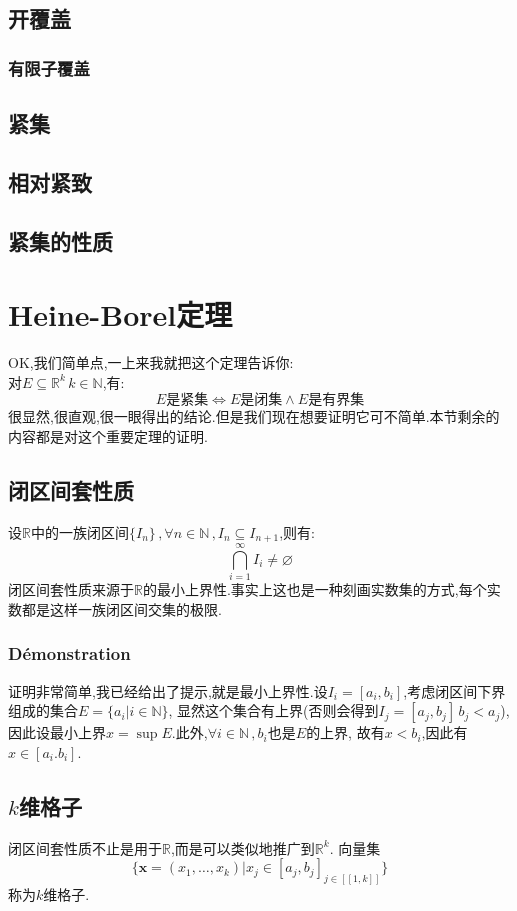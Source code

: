 \documentclass[12pt, a4paper, oneside]{ctexbook}
\begin{document}
  \subsection{开覆盖}
  \subsubsection{有限子覆盖}
  \subsection{紧集}
  \subsection{相对紧致}
  \subsection{紧集的性质}
\section{Heine-Borel定理}
  \noindent
  OK,我们简单点,一上来我就把这个定理告诉你:\\
  对$E\subseteq \mathbb{R}^k\, k\in \mathbb{N}$,有:
  $$
  E\text{是紧集}\Leftrightarrow E\text{是闭集}\land E\text{是有界集}
  $$
  很显然,很直观,很一眼得出的结论.但是我们现在想要证明它可不简单.本节剩余的内容都是对这个重要定理的证明.
  \subsection{闭区间套性质}
  设$\mathbb{R}$中的一族闭区间$\{I_n \}\,, \forall n\in \mathbb{N}\,,I_n\subseteq I_{n+1}$,则有:
  $$
    \bigcap_{i=1}^\infty I_i\neq \varnothing
  $$
  闭区间套性质来源于$\mathbb{R}$的最小上界性.事实上这也是一种刻画实数集的方式,每个实数都是这样一族闭区间交集的极限.
  \subsubsection{Démonstration}
  证明非常简单,我已经给出了提示,就是最小上界性.设$I_i=[a_i,b_i]$,考虑闭区间下界组成的集合$E=\{a_i|i\in \mathbb{N}\}$,
  显然这个集合有上界(否则会得到$I_j=[a_j,b_j]\,b_j<a_j$),因此设最小上界$x=\sup E$.此外,$\forall i\in \mathbb{N}\,,b_i$也是$E$的上界,
  故有$x<b_i$,因此有$x\in[a_i.b_i]$.
  \subsection{$k$维格子}
  闭区间套性质不止是用于$\mathbb{R}$,而是可以类似地推广到$\mathbb{R}^k$.
  向量集
  $$\{\textbf{x}=(x_1,\dots,x_k)|x_j\in[a_j,b_j]_{j\in[\![1,k]\!]} \} $$
  称为$k$维格子.
\end{document}
